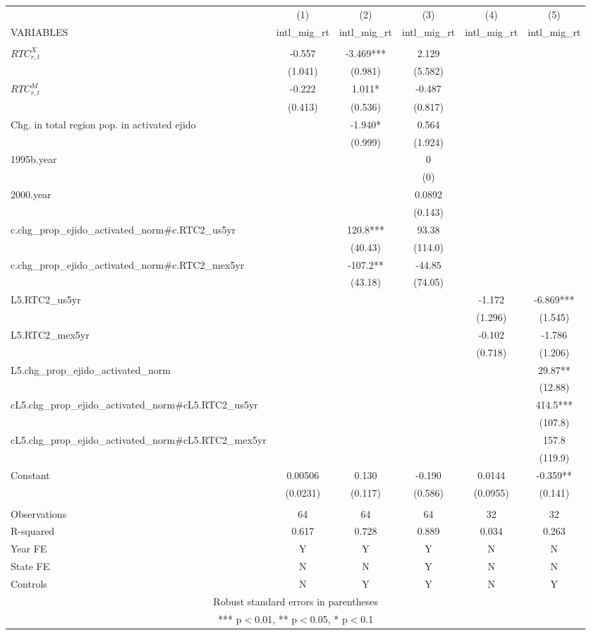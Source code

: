 \begin{tabular}{lccccc} \hline
 & (1) & (2) & (3) & (4) & (5) \\
VARIABLES & intl\_mig\_rt & intl\_mig\_rt & intl\_mig\_rt & intl\_mig\_rt & intl\_mig\_rt \\ \hline
 &  &  &  &  &  \\
$ RTC_{r,t}^X$ & -0.557 & -3.469*** & 2.129 &  &  \\
 & (1.041) & (0.981) & (5.582) &  &  \\
$ RTC_{r,t}^M$ & -0.222 & 1.011* & -0.487 &  &  \\
 & (0.413) & (0.536) & (0.817) &  &  \\
Chg. in total region pop. in activated ejido &  & -1.940* & 0.564 &  &  \\
 &  & (0.999) & (1.924) &  &  \\
1995b.year &  &  & 0 &  &  \\
 &  &  & (0) &  &  \\
2000.year &  &  & 0.0892 &  &  \\
 &  &  & (0.143) &  &  \\
c.chg\_prop\_ejido\_activated\_norm#c.RTC2\_us5yr &  & 120.8*** & 93.38 &  &  \\
 &  & (40.43) & (114.0) &  &  \\
c.chg\_prop\_ejido\_activated\_norm#c.RTC2\_mex5yr &  & -107.2** & -44.85 &  &  \\
 &  & (43.18) & (74.05) &  &  \\
L5.RTC2\_us5yr &  &  &  & -1.172 & -6.869*** \\
 &  &  &  & (1.296) & (1.545) \\
L5.RTC2\_mex5yr &  &  &  & -0.102 & -1.786 \\
 &  &  &  & (0.718) & (1.206) \\
L5.chg\_prop\_ejido\_activated\_norm &  &  &  &  & 29.87** \\
 &  &  &  &  & (12.88) \\
cL5.chg\_prop\_ejido\_activated\_norm#cL5.RTC2\_us5yr &  &  &  &  & 414.5*** \\
 &  &  &  &  & (107.8) \\
cL5.chg\_prop\_ejido\_activated\_norm#cL5.RTC2\_mex5yr &  &  &  &  & 157.8 \\
 &  &  &  &  & (119.9) \\
Constant & 0.00506 & 0.130 & -0.190 & 0.0144 & -0.359** \\
 & (0.0231) & (0.117) & (0.586) & (0.0955) & (0.141) \\
 &  &  &  &  &  \\
Observations & 64 & 64 & 64 & 32 & 32 \\
R-squared & 0.617 & 0.728 & 0.889 & 0.034 & 0.263 \\
Year FE & Y & Y & Y & N & N \\
State FE & N & N & Y & N & N \\
 Controls & N & Y & Y & N & Y \\ \hline
\multicolumn{6}{c}{ Robust standard errors in parentheses} \\
\multicolumn{6}{c}{ *** p$<$0.01, ** p$<$0.05, * p$<$0.1} \\
\end{tabular}
